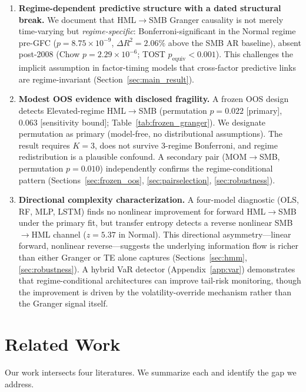 \documentclass[sigconf,anonymous]{acmart}
\begin{document}
\begin{enumerate}
    \item \textbf{Regime-dependent predictive structure with a dated structural break.}
    We document that HML$\to$SMB Granger causality is not merely time-varying
    but \emph{regime-specific}: Bonferroni-significant in the Normal regime
    pre-GFC ($p = 8.75 \times 10^{-9}$, $\Delta R^2 = 2.06\%$ above the SMB
    AR baseline), absent post-2008 (Chow $p = 2.29\times10^{-6}$; TOST
    $p_{\text{equiv}} < 0.001$). This challenges the implicit assumption in
    factor-timing models that cross-factor predictive links are
    regime-invariant (Section~\ref{sec:main_result}).

    \item \textbf{Modest OOS evidence with disclosed fragility.}
    A frozen OOS design detects Elevated-regime HML$\to$SMB
    (permutation $p = 0.022$ [primary], $0.063$ [sensitivity bound];
    Table~\ref{tab:frozen_granger}). We designate permutation as primary
    (model-free, no distributional assumptions).
    The result requires $K = 3$, does not survive 3-regime Bonferroni,
    and regime redistribution is a plausible confound.
    A secondary pair (MOM$\to$SMB, permutation $p = 0.010$) independently
    confirms the regime-conditional pattern
    (Sections~\ref{sec:frozen_oos}, \ref{sec:pairselection}, \ref{sec:robustness}).

    \item \textbf{Directional complexity characterization.}
    A four-model diagnostic (OLS, RF, MLP, LSTM) finds no nonlinear
    improvement for forward HML$\to$SMB under the primary fit, but transfer
    entropy detects a reverse nonlinear SMB$\to$HML channel ($z = 5.37$
    in Normal). This directional asymmetry---linear forward, nonlinear
    reverse---suggests the underlying information flow is richer than
    either Granger or TE alone captures
    (Sections~\ref{sec:hmm}, \ref{sec:robustness}).
    A hybrid VaR detector (Appendix~\ref{app:var}) demonstrates that
    regime-conditional architectures can improve tail-risk monitoring,
    though the improvement is driven by the volatility-override mechanism
    rather than the Granger signal itself.
\end{enumerate}

\section{Related Work}

Our work intersects four literatures. We summarize each and identify the gap we address.
\end{document}
